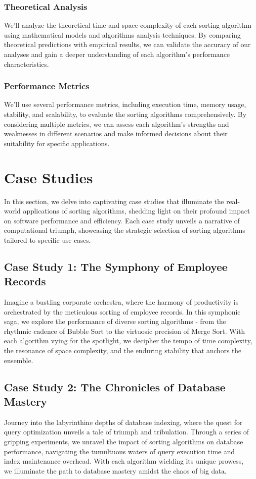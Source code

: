 \documentclass{article}
\begin{document}
\subsubsection{Theoretical Analysis}
We'll analyze the theoretical time and space complexity of each sorting algorithm using mathematical models and algorithms analysis techniques. By comparing theoretical predictions with empirical results, we can validate the accuracy of our analyses and gain a deeper understanding of each algorithm's performance characteristics.

\subsubsection{Performance Metrics}
We'll use several performance metrics, including execution time, memory usage, stability, and scalability, to evaluate the sorting algorithms comprehensively. By considering multiple metrics, we can assess each algorithm's strengths and weaknesses in different scenarios and make informed decisions about their suitability for specific applications.

\section{Case Studies}

In this section, we delve into captivating case studies that illuminate the real-world applications of sorting algorithms, shedding light on their profound impact on software performance and efficiency. Each case study unveils a narrative of computational triumph, showcasing the strategic selection of sorting algorithms tailored to specific use cases.

\subsection{Case Study 1: The Symphony of Employee Records}
Imagine a bustling corporate orchestra, where the harmony of productivity is orchestrated by the meticulous sorting of employee records. In this symphonic saga, we explore the performance of diverse sorting algorithms - from the rhythmic cadence of Bubble Sort to the virtuosic precision of Merge Sort. With each algorithm vying for the spotlight, we decipher the tempo of time complexity, the resonance of space complexity, and the enduring stability that anchors the ensemble.

\subsection{Case Study 2: The Chronicles of Database Mastery}
Journey into the labyrinthine depths of database indexing, where the quest for query optimization unveils a tale of triumph and tribulation. Through a series of gripping experiments, we unravel the impact of sorting algorithms on database performance, navigating the tumultuous waters of query execution time and index maintenance overhead. With each algorithm wielding its unique prowess, we illuminate the path to database mastery amidst the chaos of big data.
\end{document}
